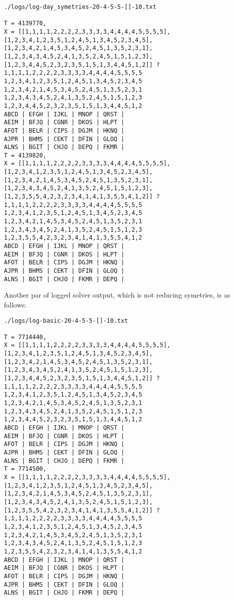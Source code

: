 \documentclass[a4paper]{article}
\theoremstyle{definition}
\theoremstyle{remark}
\begin{document}
\begin{verbatim}
./logs/log-day_symetries-20-4-5-5-[]-10.txt

T = 4139770,
X = [[1,1,1,1,2,2,2,2,3,3,3,3,4,4,4,4,5,5,5,5],[1,2,3,4,1,2,3,5,1,2,4,5,1,3,4,5,2,3,4,5],[1,2,3,4,2,1,4,5,3,4,5,2,4,5,1,3,5,2,3,1],[1,2,3,4,3,4,5,2,4,1,3,5,2,4,5,1,5,1,2,3],[1,2,3,4,4,5,2,3,2,3,5,1,5,1,3,4,4,5,1,2]] ? 
1,1,1,1,2,2,2,2,3,3,3,3,4,4,4,4,5,5,5,5
1,2,3,4,1,2,3,5,1,2,4,5,1,3,4,5,2,3,4,5
1,2,3,4,2,1,4,5,3,4,5,2,4,5,1,3,5,2,3,1
1,2,3,4,3,4,5,2,4,1,3,5,2,4,5,1,5,1,2,3
1,2,3,4,4,5,2,3,2,3,5,1,5,1,3,4,4,5,1,2
ABCD | EFGH | IJKL | MNOP | QRST | 
AEIM | BFJQ | CGNR | DKOS | HLPT | 
AFOT | BELR | CIPS | DGJM | HKNQ | 
AJPR | BHMS | CEKT | DFIN | GLOQ | 
ALNS | BGIT | CHJO | DEPQ | FKMR | 
T = 4139820,
X = [[1,1,1,1,2,2,2,2,3,3,3,3,4,4,4,4,5,5,5,5],[1,2,3,4,1,2,3,5,1,2,4,5,1,3,4,5,2,3,4,5],[1,2,3,4,2,1,4,5,3,4,5,2,4,5,1,3,5,2,3,1],[1,2,3,4,3,4,5,2,4,1,3,5,2,4,5,1,5,1,2,3],[1,2,3,5,5,4,2,3,2,3,4,1,4,1,3,5,5,4,1,2]] ? 
1,1,1,1,2,2,2,2,3,3,3,3,4,4,4,4,5,5,5,5
1,2,3,4,1,2,3,5,1,2,4,5,1,3,4,5,2,3,4,5
1,2,3,4,2,1,4,5,3,4,5,2,4,5,1,3,5,2,3,1
1,2,3,4,3,4,5,2,4,1,3,5,2,4,5,1,5,1,2,3
1,2,3,5,5,4,2,3,2,3,4,1,4,1,3,5,5,4,1,2
ABCD | EFGH | IJKL | MNOP | QRST | 
AEIM | BFJQ | CGNR | DKOS | HLPT | 
AFOT | BELR | CIPS | DGJM | HKNQ | 
AJPR | BHMS | CEKT | DFIN | GLOQ | 
ALNS | BGIT | CHJO | FKMR | DEPQ | 
\end{verbatim}

Another par of logged solver output, which is not
reducing symetries, is as follows:

\begin{verbatim}
./logs/log-basic-20-4-5-5-[]-10.txt

T = 7714440,
X = [[1,1,1,1,2,2,2,2,3,3,3,3,4,4,4,4,5,5,5,5],[1,2,3,4,1,2,3,5,1,2,4,5,1,3,4,5,2,3,4,5],[1,2,3,4,2,1,4,5,3,4,5,2,4,5,1,3,5,2,3,1],[1,2,3,4,3,4,5,2,4,1,3,5,2,4,5,1,5,1,2,3],[1,2,3,4,4,5,2,3,2,3,5,1,5,1,3,4,4,5,1,2]] ? 
1,1,1,1,2,2,2,2,3,3,3,3,4,4,4,4,5,5,5,5
1,2,3,4,1,2,3,5,1,2,4,5,1,3,4,5,2,3,4,5
1,2,3,4,2,1,4,5,3,4,5,2,4,5,1,3,5,2,3,1
1,2,3,4,3,4,5,2,4,1,3,5,2,4,5,1,5,1,2,3
1,2,3,4,4,5,2,3,2,3,5,1,5,1,3,4,4,5,1,2
ABCD | EFGH | IJKL | MNOP | QRST | 
AEIM | BFJQ | CGNR | DKOS | HLPT | 
AFOT | BELR | CIPS | DGJM | HKNQ | 
AJPR | BHMS | CEKT | DFIN | GLOQ | 
ALNS | BGIT | CHJO | DEPQ | FKMR | 
T = 7714500,
X = [[1,1,1,1,2,2,2,2,3,3,3,3,4,4,4,4,5,5,5,5],[1,2,3,4,1,2,3,5,1,2,4,5,1,3,4,5,2,3,4,5],[1,2,3,4,2,1,4,5,3,4,5,2,4,5,1,3,5,2,3,1],[1,2,3,4,3,4,5,2,4,1,3,5,2,4,5,1,5,1,2,3],[1,2,3,5,5,4,2,3,2,3,4,1,4,1,3,5,5,4,1,2]] ? 
1,1,1,1,2,2,2,2,3,3,3,3,4,4,4,4,5,5,5,5
1,2,3,4,1,2,3,5,1,2,4,5,1,3,4,5,2,3,4,5
1,2,3,4,2,1,4,5,3,4,5,2,4,5,1,3,5,2,3,1
1,2,3,4,3,4,5,2,4,1,3,5,2,4,5,1,5,1,2,3
1,2,3,5,5,4,2,3,2,3,4,1,4,1,3,5,5,4,1,2
ABCD | EFGH | IJKL | MNOP | QRST | 
AEIM | BFJQ | CGNR | DKOS | HLPT | 
AFOT | BELR | CIPS | DGJM | HKNQ | 
AJPR | BHMS | CEKT | DFIN | GLOQ | 
ALNS | BGIT | CHJO | FKMR | DEPQ | 

\end{verbatim}
\end{document}
